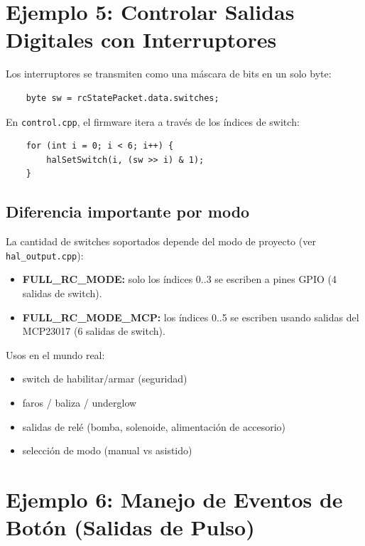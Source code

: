 \section{Ejemplo 5: Controlar Salidas Digitales con Interruptores}
\label{sec:example-switches}

Los interruptores se transmiten como una máscara de bits en un solo byte:

\begin{verbatim}
    byte sw = rcStatePacket.data.switches;
\end{verbatim}

En \texttt{control.cpp}, el firmware itera a través de los índices de switch:

\begin{verbatim}
    for (int i = 0; i < 6; i++) {
        halSetSwitch(i, (sw >> i) & 1);
    }
\end{verbatim}

\subsection*{Diferencia importante por modo}
La cantidad de switches soportados depende del modo de proyecto (ver \texttt{hal\_output.cpp}):

\begin{itemize}
    \item \textbf{FULL\_RC\_MODE:} solo los índices 0..3 se escriben a pines GPIO (4 salidas de switch).
    \item \textbf{FULL\_RC\_MODE\_MCP:} los índices 0..5 se escriben usando salidas del MCP23017 (6 salidas de switch).
\end{itemize}

\noindent Usos en el mundo real:
\begin{itemize}
    \item switch de habilitar/armar (seguridad)
    \item faros / baliza / underglow
    \item salidas de relé (bomba, solenoide, alimentación de accesorio)
    \item selección de modo (manual vs asistido)
\end{itemize}

\section{Ejemplo 6: Manejo de Eventos de Botón (Salidas de Pulso)}
\label{sec:example-events}

